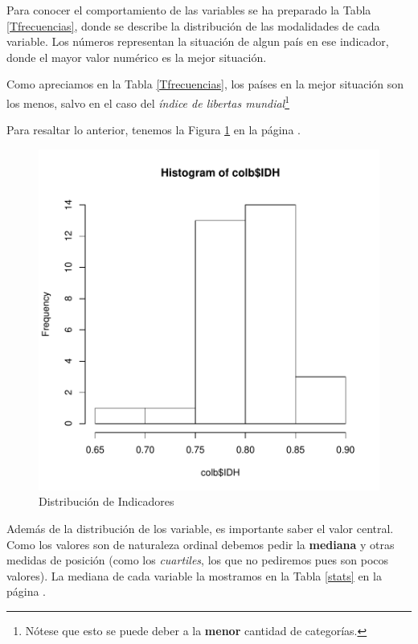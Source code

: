\documentclass{article}
\begin{document}
Para conocer el comportamiento de las variables se ha preparado la Tabla \ref{Tfrecuencias}, donde se describe la distribuci\'on de las modalidades de cada variable. Los n\'umeros representan la situaci\'on de algun pa\'is en ese indicador, donde el mayor valor num\'erico es la mejor situaci\'on.


Como apreciamos en la Tabla \ref{Tfrecuencias}, los pa\'ises en la mejor situaci\'on son los menos, salvo en el caso del \emph{\'indice de libertas mundial}\footnote{N\'otese que esto se puede deber a la {\bf menor} cantidad de categor\'ias.}

\clearpage

Para resaltar lo anterior, tenemos la Figura \ref{barplots} en la p\'agina \pageref{barplots}. 


\begin{figure}[h]
\centering

\includegraphics{FinaldeR2-barplots}

\caption{Distribuci\'on de Indicadores}
\label{barplots}
\end{figure}

Adem\'as de la distribuci\'on de los variable, es importante saber el valor central. Como los valores son de naturaleza ordinal debemos pedir la {\bf mediana} y otras medidas de posici\'on (como los \emph{cuartiles}, los que no pediremos pues son pocos valores). La mediana de cada variable la mostramos en la Tabla \ref{stats} en la p\'agina \pageref{stats}.
\end{document}
